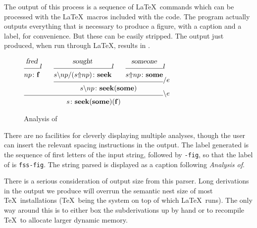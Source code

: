 The output of this process is a sequence of \LaTeX\ commands which can
be processed with the \LaTeX\ macros included with the code.  The
program actually outputs everything that is necessary to produce a
figure, with a caption and a label, for convenience.  But these can be
easily stripped.  The output just produced, when run through \LaTeX,
results in .
%
\begin{figure}[t]
\begin{center}
\small
$
\infr{\infr{\men{fred}}
           {\synsem{np}
                   {\con{f}}}
           {\lexr}
      \qquad
      \infr{\infr{\men{sought}}
                 {\synsem{\fd{\bk{s}
                                 {np}}
                             {(\scop{s}
                                    {np})}}
                         {\con{seek}}}
                 {\lexr}
            \qquad
            \infr{\men{someone}}
                 {\synsem{\scop{s}
                               {np}}
                         {\con{some}}}
                 {\lexr}}
           {\synsem{\bk{s}
                       {np}}
                   {\con{seek}
                    (\con{some})}}
           {\fel}}
     {\synsem{s}
             {\con{seek}
              (\con{some})
              (\con{f})}}
     {\bel}
$
\caption{Analysis of }
\label{fss-fig}
\end{center}
\end{figure}
%
There are no facilities for cleverly displaying multiple analyses,
though the user can insert the relevant spacing instructions in the
output.  The label generated is the sequence of first letters of the
input string, followed by {\tt -fig}, so that the label of
 is {\tt fss-fig}.  The string parsed is displayed as
a caption following {\it Analysis of}.

There is a serious consideration of output size from this parser.
Long derivations in the output we produce will overrun the semantic
nest size of most \TeX\ installations (\TeX\ being the system on top
of which \LaTeX\ runs).  The only way around this is to either box the
subderivations up by hand or to recompile \TeX\ to allocate larger
dynamic memory.

